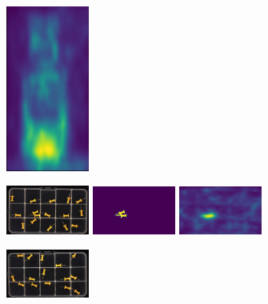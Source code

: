\begin{figure}[H]
\begin{subfigure}[b]{\textwidth}
\begin{minipage}{0.45\textwidth}
            \includegraphics[width=0.3\textwidth]{figures/appendix/appendix_RevDist/JB/013_m.png}
        \end{minipage}
    \end{subfigure}
    \hfill
    \begin{subfigure}[b]{\textwidth}
        \centering
        \begin{minipage}{0.45\textwidth}
            \centering
            \includegraphics[width=0.3\textwidth]{figures/appendix/appendix_RevDist/PP/003.png}
            \includegraphics[width=0.3\textwidth]{figures/appendix/appendix_RevDist/PP/003_mask.png}
            \includegraphics[width=0.3\textwidth]{figures/appendix/appendix_RevDist/PP/003_m.png}
        \end{minipage}
        \begin{minipage}{0.45\textwidth}
            \centering
            \includegraphics[width=0.3\textwidth]{figures/appendix/appendix_RevDist/PP/008.png}

\end{minipage}
\end{subfigure}
\end{figure}
